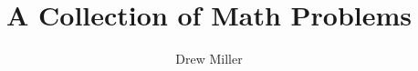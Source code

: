 \documentclass[12pt]{article}
\title{A Collection of Math Problems}
\author{Drew Miller}
\date{}
\begin{document}
\maketitle
\tableofcontents

\section{}
\end{document}

